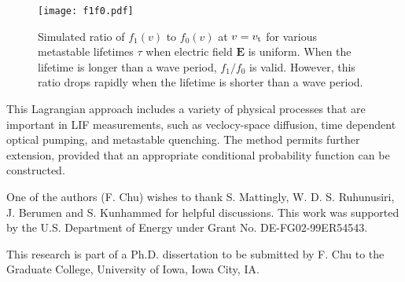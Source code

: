 \documentclass[aip,pop,reprint]{revtex4-1}
\begin{document}
\begin{figure}
\begin{center}
\texttt{[image: f1f0.pdf]}
\caption{Simulated ratio of $f_1(v)$ to $f_0(v)$ at $v=v_\textup{t}$ for various metastable lifetimes $\tau$ when electric field $\mathbf{E}$ is uniform. When the lifetime is longer than a wave period, $f_1/f_0$ is valid. However, this ratio drops rapidly when the lifetime is shorter than a wave period.}
\label{fig:f1f0}
\end{center}
\end{figure}

This Lagrangian approach includes a variety of physical processes that are important in LIF measurements, such as veclocy-space diffusion, time dependent optical pumping, and metastable quenching. The method permits further extension, provided that an appropriate conditional probability function can be constructed.


\begin{acknowledgments}

One of the authors (F. Chu) wishes to thank S. Mattingly, W. D. S. Ruhunusiri, J. Berumen and S. Kunhammed for helpful discussions. This work was supported by the U.S. Department of Energy under Grant No. DE-FG02-99ER54543. 

This research is part of a Ph.D. dissertation to be submitted by F. Chu to the Graduate College, University of Iowa, Iowa City, IA.

\end{acknowledgments}


\end{document}
